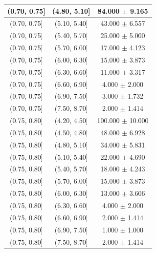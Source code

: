 \begin{longtable}{|c|c|c|}
\hline
(0.70, 0.75] & (4.80, 5.10] & 84.000 $\pm$ 9.165 \\ 
\hline
(0.70, 0.75] & (5.10, 5.40] & 43.000 $\pm$ 6.557 \\ 
\hline
(0.70, 0.75] & (5.40, 5.70] & 25.000 $\pm$ 5.000 \\ 
\hline
(0.70, 0.75] & (5.70, 6.00] & 17.000 $\pm$ 4.123 \\ 
\hline
(0.70, 0.75] & (6.00, 6.30] & 15.000 $\pm$ 3.873 \\ 
\hline
(0.70, 0.75] & (6.30, 6.60] & 11.000 $\pm$ 3.317 \\ 
\hline
(0.70, 0.75] & (6.60, 6.90] & 4.000 $\pm$ 2.000 \\ 
\hline
(0.70, 0.75] & (6.90, 7.50] & 3.000 $\pm$ 1.732 \\ 
\hline
(0.70, 0.75] & (7.50, 8.70] & 2.000 $\pm$ 1.414 \\ 
\hline
(0.75, 0.80] & (4.20, 4.50] & 100.000 $\pm$ 10.000 \\ 
\hline
(0.75, 0.80] & (4.50, 4.80] & 48.000 $\pm$ 6.928 \\ 
\hline
(0.75, 0.80] & (4.80, 5.10] & 34.000 $\pm$ 5.831 \\ 
\hline
(0.75, 0.80] & (5.10, 5.40] & 22.000 $\pm$ 4.690 \\ 
\hline
(0.75, 0.80] & (5.40, 5.70] & 18.000 $\pm$ 4.243 \\ 
\hline
(0.75, 0.80] & (5.70, 6.00] & 15.000 $\pm$ 3.873 \\ 
\hline
(0.75, 0.80] & (6.00, 6.30] & 13.000 $\pm$ 3.606 \\ 
\hline
(0.75, 0.80] & (6.30, 6.60] & 4.000 $\pm$ 2.000 \\ 
\hline
(0.75, 0.80] & (6.60, 6.90] & 2.000 $\pm$ 1.414 \\ 
\hline
(0.75, 0.80] & (6.90, 7.50] & 1.000 $\pm$ 1.000 \\ 
\hline
(0.75, 0.80] & (7.50, 8.70] & 2.000 $\pm$ 1.414 \\ 
\hline
\end{longtable}
